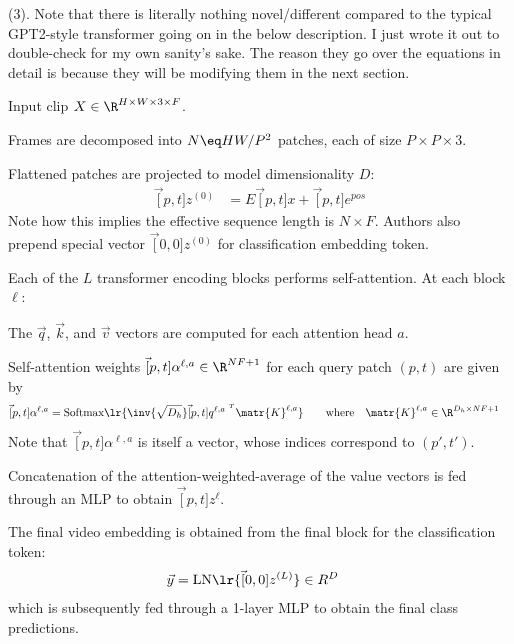 \documentclass[11pt]{article}
\begin{document}
 (3). Note that there is literally nothing novel/different compared to the typical GPT2-style transformer going on in the below description. I just wrote it out to double-check for my own sanity's sake. The reason they go over the equations in detail is because they will be modifying them in the next section. 
\begin{compactenum}
	\item Input clip $X \in \R^{H \times W \times 3 \times F}$.
	
	\item Frames are decomposed into $N \eq HW/P^2$ patches, each of size $P \times P \times 3$. 
	
	\item Flattened patches are projected to model dimensionality $D$:
	\begin{align}
		\vec[p,t]{z}^{(0)}
			&= E \vec[p,t]{x} + \vec[p,t]{e}^{pos}
	\end{align}
	Note how this implies the effective sequence length is $N \times F$. Authors also prepend special vector $\vec[0,0]{z}^{(0)}$ for classification embedding token. 
	
	\item Each of the $L$ transformer encoding blocks performs self-attention. At each block $\ell$:
	\begin{compactenum}
		\item The $\vec q$, $\vec k$, and $\vec v$ vectors are computed for each attention head $a$. 
		
		\item Self-attention weights $\vec[p,t]{\alpha}^{\ell,a} \in \R^{NF+1}$ for each query patch $(p, t)$ are given by
		\begin{align}
			\vec[p,t]{\alpha}^{\ell,a}
				&= \text{Softmax}\lr{ 
						\inv{\sqrt{D_h}} \vec[p,t]{q}^{\ell,a^{~T}} \matr{K}^{\ell, a}
				} \qquad \text{where} \quad \matr{K}^{\ell, a} \in \R^{D_h \times NF+1 }
		\end{align}
	Note that $	\vec[p,t]{\alpha}^{\ell,a}$ is itself a vector, whose indices correspond to $(p', t')$. 
	
	\item Concatenation of the  attention-weighted-average of the value vectors is fed through an MLP to obtain $\vec[p,t]{z}^{\ell}$. 
	\end{compactenum}

	\item The final video embedding is obtained from the final block for the classification token:
	\begin{align}
			\vec y &= \text{LN}\lr{  \vec[0,0]{z}^{(L)}  } \in R^D
	\end{align}
	which is subsequently fed through a 1-layer MLP to obtain the final class predictions. 
\end{compactenum}
\end{document}
